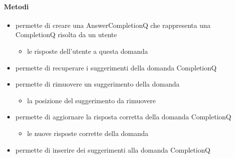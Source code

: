 \paragraph{Metodi}
\begin{itemize}
\item {}
\newline
permette di creare una AnswerCompletionQ che rappresenta una CompletionQ risolta da un utente
\newline
{}
\newline
\begin{itemize}
\item {}
\newline
le risposte dell'utente a questa domanda
\end{itemize}
\item {}
\newline
permette di recuperare i suggerimenti della domanda CompletionQ
\newline
\item {}
\newline
permette di rimuovere un suggerimento della domanda
\newline
{}
\newline
\begin{itemize}
\item {}
\newline
la posizione del suggerimento da rimuovere
\end{itemize}
\item {}
\newline
permette di aggiornare la risposta corretta della domanda CompletionQ
\newline
{}
\newline
\begin{itemize}
\item {}
\newline
le nuove risposte corrette della domanda
\end{itemize}
\item {}
\newline
permette di inserire dei suggerimenti alla domanda CompletionQ
\newline
{}

\end{itemize}
